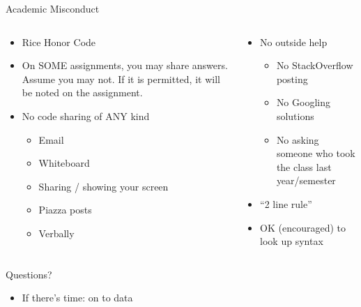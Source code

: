 \documentclass[aspectratio=169]{beamer}
\begin{document}
\begin{frame}{Academic Misconduct}

\begin{columns}[t]
\begin{column}{0.5\textwidth}
\begin{itemize}
\item Rice Honor Code
\item On SOME assignments, you may share answers. Assume you may not. If it is permitted, it will be noted on the assignment.
\item No code sharing of ANY kind
\begin{itemize}
\item Email
\item Whiteboard
\item Sharing / showing your screen
\item Piazza posts
\item Verbally
\end{itemize}
\end{itemize}
\end{column}
\begin{column}{0.5\textwidth} 
\begin{itemize}
\item No outside help
\begin{itemize}
\item No StackOverflow posting
\item No Googling solutions
\item No asking someone who took the class last year/semester
\end{itemize}
\item ``2 line rule''
\item  OK (encouraged) to look up syntax
\end{itemize}
\end{column}
\end{columns}
\end{frame}



\begin{frame}{Questions?}

\begin{itemize}
\item If there's time: on to data
\end{itemize}

\end{frame}
\end{document}
